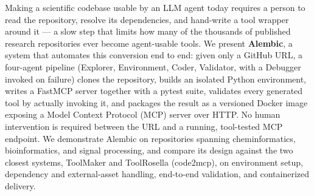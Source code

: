 Making a scientific codebase usable by an LLM agent today requires a person to read the repository, resolve its dependencies, and hand-write a tool wrapper around it — a slow step that limits how many of the thousands of published research repositories ever become agent-usable tools. We present \textbf{Alembic}, a system that automates this conversion end to end: given only a GitHub URL, a four-agent pipeline (Explorer, Environment, Coder, Validator, with a Debugger invoked on failure) clones the repository, builds an isolated Python environment, writes a FastMCP server together with a pytest suite, validates every generated tool by actually invoking it, and packages the result as a versioned Docker image exposing a Model Context Protocol (MCP) server over HTTP. No human intervention is required between the URL and a running, tool-tested MCP endpoint. We demonstrate Alembic on repositories spanning cheminformatics, bioinformatics, and signal processing, and compare its design against the two closest systems, ToolMaker and ToolRosella (code2mcp), on environment setup, dependency and external-asset handling, end-to-end validation, and containerized delivery.
